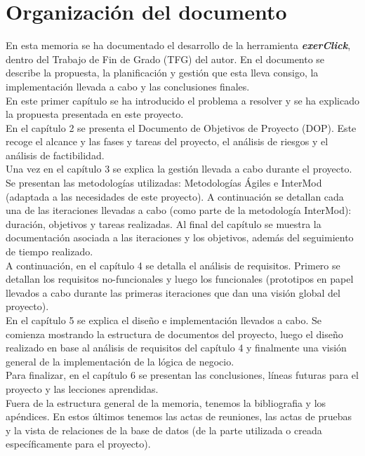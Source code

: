 \section{Organización del documento}

En esta memoria se ha documentado  el desarrollo de la herramienta \textbf{\textit{exerClick}}, dentro del Trabajo de Fin de Grado (TFG) del autor. En el documento se describe la propuesta, la planificación y gestión que esta lleva consigo, la implementación llevada a cabo y las conclusiones finales.\\

En este primer capítulo se ha introducido el problema a resolver y se ha explicado la propuesta presentada en este proyecto.\\

En el capítulo 2 se presenta el Documento de Objetivos de Proyecto (DOP). Este recoge el alcance y las fases y tareas del proyecto, el análisis de riesgos y el análisis de factibilidad.\\

Una vez en el capítulo 3 se explica la gestión llevada a cabo durante el proyecto. Se presentan las metodologías utilizadas: Metodologías Ágiles e InterMod (adaptada a las necesidades de este proyecto). A continuación se detallan cada una de las iteraciones llevadas a cabo (como parte de la metodología InterMod): duración, objetivos y tareas realizadas. Al final del capítulo se muestra la documentación asociada a las iteraciones y los objetivos, además del seguimiento de tiempo realizado.\\

A continuación, en el capítulo 4 se detalla el análisis de requisitos. Primero se detallan los requisitos no-funcionales y luego los funcionales (prototipos en papel llevados a cabo durante las primeras iteraciones que dan una visión global del proyecto).\\

En el capítulo 5 se explica el diseño e implementación llevados a cabo. Se comienza mostrando la estructura de documentos del proyecto, luego el diseño realizado en base al análisis de requisitos del capítulo 4 y finalmente una visión general de la implementación de la lógica de negocio.\\

Para finalizar, en el capítulo 6 se presentan las conclusiones, líneas futuras para el proyecto y las lecciones aprendidas.\\

Fuera de la estructura general de la memoria, tenemos la bibliografia y los apéndices. En estos últimos tenemos las actas de reuniones, las actas de pruebas y la vista de relaciones de la base de datos (de la parte utilizada o creada específicamente para el proyecto).\\